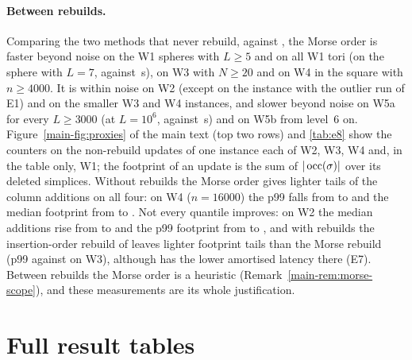 \paragraph{Between rebuilds.} Comparing the two methods that never rebuild,
 against , the Morse order is faster beyond
noise on the W1 spheres with $L\ge5$ and on all W1 tori (on the sphere
with $L=7$, \NumWOneSphereLSevenMmhmNorbAmort{} against
\NumWOneSphereLSevenDrbIdAmort\,\textmu s), on W3 with $N\ge20$ and on W4 in the
square with $n\ge4000$. It is within noise on W2 (except on the instance with
the outlier run of E1) and on the smaller W3 and W4 instances, and slower beyond noise on W5a for every $L\ge3000$ (at $L=10^6$,
\NumWFiveCycleLOneMillionMmhmNorbAmort{} against
\NumWFiveCycleLOneMillionDrbIdAmort\,\textmu s) and on W5b from level~6 on.
Figure~\ref{main-fig:proxies} of the main text (top two rows) and
\cref{tab:e8} show the counters on the non-rebuild updates of one instance each
of W2, W3, W4 and, in the table only, W1; the footprint of an update is the sum of
$|\operatorname{occ}(\sigma)|$ over its deleted simplices. Without rebuilds the Morse order
gives lighter tails of the column additions on all four: on W4 ($n=16000$) the
p99 falls from \NumEEightWFourPlaneNSixteenThousandDTwoDrbIdAddsPNinetyNine{} to
\NumEEightWFourPlaneNSixteenThousandDTwoMmhmNorbAddsPNinetyNine{} and the median
footprint from \NumEEightWFourPlaneNSixteenThousandDTwoDrbIdFootprintMed{} to
\NumEEightWFourPlaneNSixteenThousandDTwoMmhmNorbFootprintMed. Not every quantile
improves: on W2 the median additions rise from
\NumEEightWTwoNTwentyTwoSEightDrbIdAddsMed{} to
\NumEEightWTwoNTwentyTwoSEightMmhmNorbAddsMed{} and the p99 footprint from
\NumEEightWTwoNTwentyTwoSEightDrbIdFootprintPNinetyNine{} to
\NumEEightWTwoNTwentyTwoSEightMmhmNorbFootprintPNinetyNine, and with rebuilds the
insertion-order rebuild of  leaves lighter footprint tails than
the Morse rebuild (p99 \NumEEightWThreeNTwentyDrbIdRbFootprintPNinetyNine{}
against \NumEEightWThreeNTwentyMmhmFootprintPNinetyNine{} on W3), although
 has the lower amortised latency there (E7). Between rebuilds the
Morse order is a heuristic (Remark~\ref{main-rem:morse-scope}), and these measurements are
its whole justification.

\clearpage
\section{Full result tables}\label{sec:s-tables}

